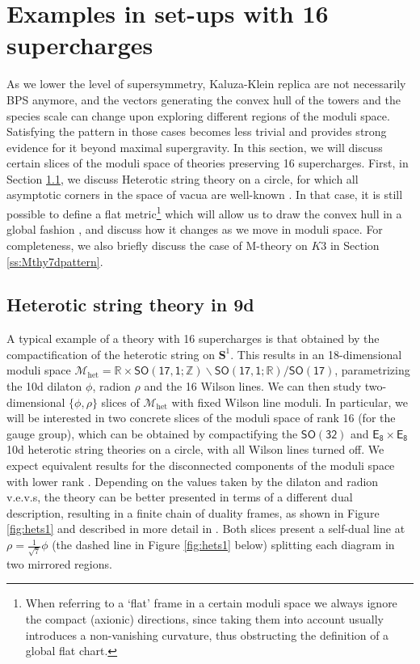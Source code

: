 \section{Examples in set-ups with 16 supercharges}
\label{s:16supercharges}
	
As we lower the level of supersymmetry, Kaluza-Klein replica are not necessarily BPS anymore, and the vectors generating the convex hull of the towers and the species scale can change upon exploring different regions of the moduli space. Satisfying the pattern in those cases becomes less trivial and provides strong evidence for it beyond maximal supergravity. In this section, we will discuss certain slices of the moduli space of theories preserving 16 supercharges. First, in Section \ref{ss:het s1}, we discuss Heterotic string theory on a circle, for which all asymptotic corners in the space of vacua are well-known \cite{Aharony:2007du}. In that case, it is still possible to define a flat metric\footnote{When referring to a `flat' frame in a certain moduli space we always ignore the compact (axionic) directions, since taking them into account usually introduces a non-vanishing curvature, thus obstructing the definition of a global flat chart.} which will allow us to draw the convex hull in a global fashion \cite{Etheredge:2023odp}, and discuss how it changes as we move in moduli space. For completeness, we also briefly discuss the case of M-theory on $K3$ in Section \ref{ss:Mthy7dpattern}.
	
\subsection{Heterotic string theory in 9d}
\label{ss:het s1}
	
A typical example of a theory with 16 supercharges is that obtained by the compactification of the heterotic string on $\mathbf{S}^1$. This results in an 18-dimensional moduli space $\mathcal{M}_{\text{het}}=\mathbb{R}\times \mathsf{SO(17,1;\mathbb{Z})\backslash SO(17,1;\mathbb{R})/SO(17)}$, parametrizing the 10d dilaton $\phi$, radion $\rho$ and the 16 Wilson lines. We can then study two-dimensional $\{\phi,\rho\}$ slices of $\mathcal{M}_{\text{het}}$ with fixed Wilson line moduli. In particular, we will be interested in two concrete slices of the moduli space of rank 16 (for the gauge group), which can be obtained by compactifying the $\mathsf{SO(32)}$ and $\mathsf{E_8\times E_8}$ 10d heterotic string theories on a circle, with all Wilson lines turned off. We expect equivalent results for the disconnected components of the moduli space with lower rank \cite{Aharony:2007du, Etheredge:2023odp}. Depending on the values taken by the dilaton and radion v.e.v.s, the theory can be better presented in terms of a different dual description, resulting in a finite chain of duality frames, as shown in Figure \ref{fig:hets1} and described in more detail in \cite{Aharony:2007du, Etheredge:2023odp}. Both slices present a self-dual line at $\rho=\frac{1}{\sqrt{7}}\phi$ (the dashed line in Figure \ref{fig:hets1} below) splitting each diagram in two mirrored regions.
	

